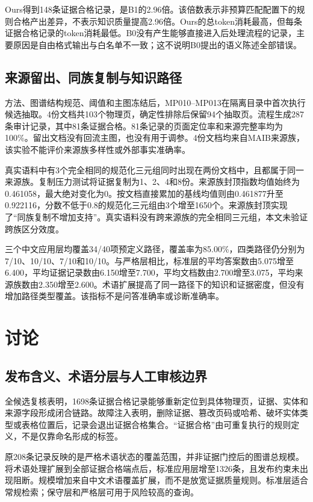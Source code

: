 \documentclass[conference,a4paper]{IEEEtran}
\begin{document}
Ours得到148条证据合格记录，是B1的2.96倍。该倍数表示非预算匹配配置下的规则合格产出差异，不表示知识质量提高2.96倍。Ours的总token消耗最高，但每条证据合格记录的token消耗最低。B0没有产生能够直接进入后处理流程的记录，主要原因是自由格式输出与白名单不一致；这不说明B0提出的语义陈述全部错误。

\subsection{来源留出、同族复制与知识路径}

方法、图谱结构规范、阈值和主图冻结后，MP010--MP013在隔离目录中首次执行候选抽取。4份文档共103个物理页，确定性排除后保留94个抽取页。流程生成287条审计记录，其中81条证据合格。81条记录的页面定位率和来源完整率均为100\%。留出文档没有回流主图，也没有用于调参。4份文档均来自MAIB来源族，该实验不能评价来源族多样性或外部事实准确率。

真实语料中有3个完全相同的规范化三元组同时出现在两份文档中，且都属于同一来源族。复制压力测试将证据复制为1、2、4和8份。来源族封顶指数均值始终为0.461058，最大绝对变化为0。按文档直接累加的基线均值则由0.461877升至0.922116，分数不低于0.8的规范化三元组由3个增至1650个。来源族封顶实现了“同族复制不增加支持”。真实语料没有跨来源族的完全相同三元组，本文未验证跨族区分效度。

三个中文应用层均覆盖34/40项预定义路径，覆盖率为85.00\%，四类路径仍分别为7/10、10/10、7/10和10/10。与严格层相比，标准层的平均答案数由5.075增至6.400，平均证据记录数由6.150增至7.700，平均文档数由2.700增至3.075，平均来源族数由2.350增至2.600。术语扩展提高了同一路径下的知识和证据密度，但没有增加路径类型覆盖。该指标不是问答准确率或诊断准确率。

\section{讨论}

\subsection{发布含义、术语分层与人工审核边界}

全候选复核表明，1698条证据合格记录能够重新定位到具体物理页，证据、实体和来源字段形成闭合链路。故障注入表明，删除证据、篡改页码或哈希、破坏实体类型或表格位置后，记录会退出证据合格集合。“证据合格”由可重复执行的规则定义，不是仅靠命名形成的标签。

原208条记录反映的是严格术语状态的覆盖范围，并非证据门控后的图谱总规模。将术语处理扩展到全部证据合格端点后，标准应用层增至1326条，且发布约束未出现阻断。规模增加来自中文术语覆盖扩展，而不是放宽证据质量规则。标准层适合常规检索；保守层和严格层可用于风险较高的查询。
\end{document}
